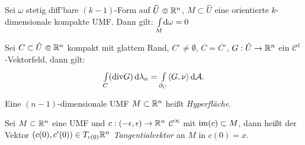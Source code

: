\documentclass{cheat-sheet}
\theoremstyle{definition}
\newcommand{\Intdf}[2]{{\textstyle \int\limits_{#1}} #2} %
\begin{document}
\iffalse
\begin{satz}[Stokes]
  Gegeben sei
  \begin{itemize}
    \item $M \subset \R^n$ $k$-dimensionale Untermannigfaltigkeit
    \item $\widehat{U} \opn \R^n$, $M \subset \widehat{U}$
    \item $\omega$ stetig diff'bare $(k{-}1)$-Form auf $\widehat{U}$.
    \item $C \subset M$ Kompaktum mit glattem Rand $\partial_M C$.
  \end{itemize}
  Dann gilt (bzgl. der induzierten Orientierung auf $\partial_M C$)
\end{satz}
\fi



\begin{kor}
  Sei $\omega$ stetig diff'bare $(k{-}1)$-Form auf $\widehat{U} \opn \R^n$, $M \subset \widehat{U}$ eine orientierte $k$-dimensionale kompakte UMF.
  Dann gilt: $\Intdf{M}{\d \omega} = 0$
\end{kor}



\begin{satz}[Divergenzsatz]
  Sei $C \subset \hat{U} \opn \R^n$ kompakt mit glattem Rand, $C^\circ \not= \emptyset$, $C = \overline{C^\circ}$, $G : \hat{U} \to \mathbb{R}^n$ ein $\mathcal{C}^1$-Vektorfeld, dann gilt:
  \[ {\textstyle \int\limits_{C}^{}} (\mathrm{div} G) \,\mathrm{d} \lambda_n = {\textstyle \int\limits_{\partial_C}^{}} \langle G, \nu \rangle \,\mathrm{d} \mathcal{A}. \]
\end{satz}


\begin{defn}
  Eine $(n{-}1)$-dimensionale UMF $M \subset \R^n$ heißt \emph{Hyperfläche}.
\end{defn}



\begin{defn}
  Sei $M \subset \R^n$ eine UMF und $c : \left( -\epsilon, \epsilon \right) \to \mathbb{R}^n$ $\mathcal{C}^\infty$ mit $\mathop{\mathrm{im}}(c) \subset M$, dann heißt der Vektor $(c(0), c'(0)) \in T_{c(0)} \mathbb{R}^n$ \emph{Tangentialvektor} an $M$ in $c(0) = x$.
\end{defn}
\end{document}
